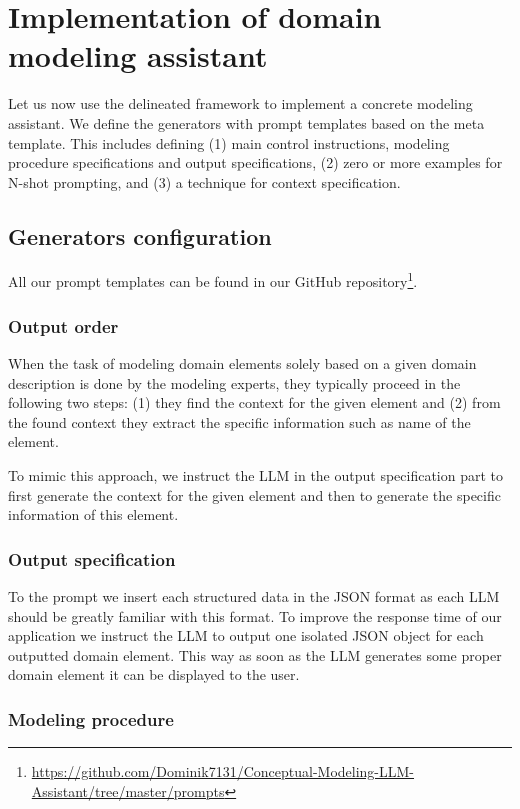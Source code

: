 \chapter{Implementation of domain modeling assistant}

Let us now use the delineated framework to implement a concrete modeling assistant. We define the generators with prompt templates based on the meta
template. This includes defining (1) main control instructions, modeling procedure specifications and output specifications, (2) zero or more examples for N-shot prompting, and (3) a technique for context specification.


\section{Generators configuration}

All our prompt templates can be found in our GitHub repository\footnote{\url{https://github.com/Dominik7131/Conceptual-Modeling-LLM-Assistant/tree/master/prompts}}.


\subsection{Output order}
\label{sec:output_order}

When the task of modeling domain elements solely based on a given domain description is done by the modeling experts, they typically proceed in the following two steps: (1) they find the context for the given element and (2) from the found context they extract the specific information such as name of the element.

To mimic this approach, we instruct the LLM in the output specification part to first generate the context for the given element and then to generate the specific information of this element.


\subsection{Output specification}

To the prompt we insert each structured data in the JSON format as each LLM should be greatly familiar with this format. To improve the response time of our application we instruct the LLM to output one isolated JSON object for each outputted domain element. This way as soon as the LLM generates some proper domain element it can be displayed to the user.


\subsection{Modeling procedure}

